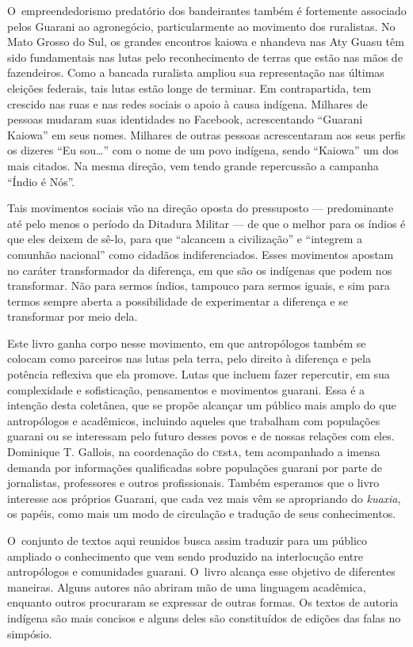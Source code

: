 O~empreendedorismo predatório dos bandeirantes também é fortemente
associado pelos Guarani ao agronegócio, particularmente ao movimento
dos ruralistas. No Mato Grosso do Sul, os grandes encontros kaiowa e
nhandeva nas Aty Guasu têm sido fundamentais nas lutas pelo
reconhecimento de terras que estão nas mãos de fazendeiros. Como a
bancada ruralista ampliou sua representação nas últimas eleições
federais, tais lutas estão longe de terminar. Em contrapartida, tem
crescido nas ruas e nas redes sociais o apoio à causa indígena.
Milhares de pessoas mudaram suas identidades no Facebook, acrescentando
``Guarani Kaiowa'' em seus nomes. Milhares de outras pessoas
acrescentaram aos seus perfis os dizeres ``Eu sou\ldots{}'' com o nome de um
povo indígena, sendo ``Kaiowa'' um dos mais citados. Na mesma direção,
vem tendo grande repercussão a campanha ``Índio é Nós''.

Tais movimentos sociais vão na direção oposta do pressuposto ---
predominante até pelo menos o período da Ditadura Militar --- de que o
melhor para os índios é que eles deixem de sê-lo, para que ``alcancem a
civilização'' e ``integrem a comunhão nacional'' como cidadãos
indiferenciados. Esses movimentos apostam no caráter transformador da
diferença, em que são os indígenas que podem nos transformar. Não para
sermos índios, tampouco para sermos iguais, e sim para termos sempre
aberta a possibilidade de experimentar a diferença e se transformar por
meio dela.

Este livro ganha corpo nesse movimento, em que antropólogos também se
colocam como parceiros nas lutas pela terra, pelo direito à diferença e
pela potência reflexiva que ela promove. Lutas que incluem fazer
repercutir, em sua complexidade e sofisticação, pensamentos e
movimentos guarani. Essa é a intenção desta coletânea, que se propõe
alcançar um público mais amplo do que antropólogos e acadêmicos,
incluindo aqueles que trabalham com populações guarani ou se interessam
pelo futuro desses povos e de nossas relações com eles. Dominique T.
Gallois, na coordenação do \textsc{ce}st\textsc{a}, tem acompanhado a imensa demanda por
informações qualificadas sobre populações guarani por
parte de jornalistas, professores e outros profissionais. Também esperamos que
o livro interesse aos próprios Guarani, que cada vez mais vêm se
apropriando do \emph{kuaxia}, os papéis, como mais um modo de circulação e
tradução de seus conhecimentos.

O~conjunto de textos aqui reunidos busca assim traduzir para um público
ampliado o conhecimento que vem sendo produzido na interlocução entre
antropólogos e comunidades guarani. O~livro alcança esse objetivo de
diferentes maneiras. Alguns autores não abriram mão de uma linguagem
acadêmica, enquanto outros procuraram se expressar de outras formas. Os
textos de autoria indígena são mais concisos e alguns deles são constituídos de
edições das falas no simpósio. 

